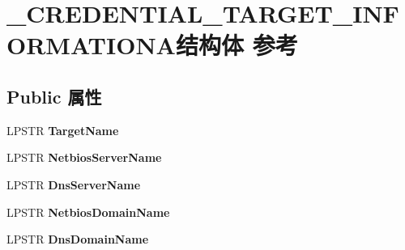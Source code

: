 \hypertarget{struct___c_r_e_d_e_n_t_i_a_l___t_a_r_g_e_t___i_n_f_o_r_m_a_t_i_o_n_a}{}\section{\+\_\+\+C\+R\+E\+D\+E\+N\+T\+I\+A\+L\+\_\+\+T\+A\+R\+G\+E\+T\+\_\+\+I\+N\+F\+O\+R\+M\+A\+T\+I\+O\+N\+A结构体 参考}
\label{struct___c_r_e_d_e_n_t_i_a_l___t_a_r_g_e_t___i_n_f_o_r_m_a_t_i_o_n_a}
\subsection*{Public 属性}
\begin{DoxyCompactItemize}
\item 
\mbox{\label{struct___c_r_e_d_e_n_t_i_a_l___t_a_r_g_e_t___i_n_f_o_r_m_a_t_i_o_n_a_a1d4c2f3e7dadc3a56e90c33b1f65c068}} 
L\+P\+S\+TR {\bfseries Target\+Name}
\item 
\mbox{\label{struct___c_r_e_d_e_n_t_i_a_l___t_a_r_g_e_t___i_n_f_o_r_m_a_t_i_o_n_a_affbb3aba0d15df431e23bae309ff285b}} 
L\+P\+S\+TR {\bfseries Netbios\+Server\+Name}
\item 
\mbox{\label{struct___c_r_e_d_e_n_t_i_a_l___t_a_r_g_e_t___i_n_f_o_r_m_a_t_i_o_n_a_afb5c1bf2c52f424e7c6c165c9b7baf22}} 
L\+P\+S\+TR {\bfseries Dns\+Server\+Name}
\item 
\mbox{\label{struct___c_r_e_d_e_n_t_i_a_l___t_a_r_g_e_t___i_n_f_o_r_m_a_t_i_o_n_a_a4352fec5878e6248ab250cc8e69990d3}} 
L\+P\+S\+TR {\bfseries Netbios\+Domain\+Name}
\item 
\mbox{\label{struct___c_r_e_d_e_n_t_i_a_l___t_a_r_g_e_t___i_n_f_o_r_m_a_t_i_o_n_a_a4fe4ef7373e47009aebfd3efb4b11416}} 
L\+P\+S\+TR {\bfseries Dns\+Domain\+Name}
\item 
\mbox{\label{struct___c_r_e_d_e_n_t_i_a_l___t_a_r_g_e_t___i_n_f_o_r_m_a_t_i_o_n_a_a3a6faccdcaa546f3a848834a65dd1a70}} 

\end{DoxyCompactItemize}
